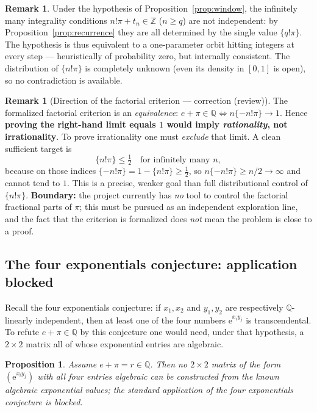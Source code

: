\documentclass[11pt]{amsart}
\newtheorem{proposition}[theorem]{Proposition}
\theoremstyle{definition}
\newtheorem{remark}[theorem]{Remark}
\theoremstyle{remark}
\numberwithin{equation}{section}
\newcommand{\Q}{\mathbb{Q}}
\newcommand{\Z}{\mathbb{Z}}
\newcommand{\ee}{\mathrm{e}}
\begin{document}
\begin{remark}
Under the hypothesis of Proposition~\ref{prop:window}, the infinitely many integrality conditions $n!\pi+t_n\in\Z$ ($n\ge q$) are not independent: by Proposition~\ref{prop:recurrence} they are all determined by the single value $\{q!\pi\}$. The hypothesis is thus equivalent to a one-parameter orbit hitting integers at every step --- heuristically of probability zero, but internally consistent. The distribution of $\{n!\pi\}$ is completely unknown (even its density in $[0,1]$ is open), so no contradiction is available.
\end{remark}

\begin{remark}[Direction of the factorial criterion --- correction (review)]\label{rem:factorial-direction}
The formalized factorial criterion is an \emph{equivalence}: $e+\pi\in\Q \iff n\{-n!\pi\}\to1$. Hence \textbf{proving the right-hand limit equals $1$ would imply \emph{rationality}, not irrationality}. To prove irrationality one must \emph{exclude} that limit. A clean sufficient target is
\[
\{n!\pi\}\le\tfrac12 \quad\text{for infinitely many }n,
\]
because on those indices $\{-n!\pi\}=1-\{n!\pi\}\ge\tfrac12$, so $n\{-n!\pi\}\ge n/2\to\infty$ and cannot tend to $1$. This is a precise, weaker goal than full distributional control of $\{n!\pi\}$. \textbf{Boundary:} the project currently has \emph{no} tool to control the factorial fractional parts of $\pi$; this must be pursued as an independent exploration line, and the fact that the criterion is formalized does \emph{not} mean the problem is close to a proof.
\end{remark}

\subsection{The four exponentials conjecture: application blocked}

Recall the four exponentials conjecture: if $x_1,x_2$ and $y_1,y_2$ are respectively $\Q$-linearly independent, then at least one of the four numbers $\ee^{x_iy_j}$ is transcendental. To refute $e+\pi\in\Q$ by this conjecture one would need, under that hypothesis, a $2\times2$ matrix all of whose exponential entries are algebraic.

\begin{proposition}\label{prop:four-exp}
Assume $e+\pi=r\in\Q$. Then no $2\times2$ matrix of the form $(\ee^{x_iy_j})$ with all four entries algebraic can be constructed from the known algebraic exponential values; the standard application of the four exponentials conjecture is blocked.
\end{proposition}
\end{document}
